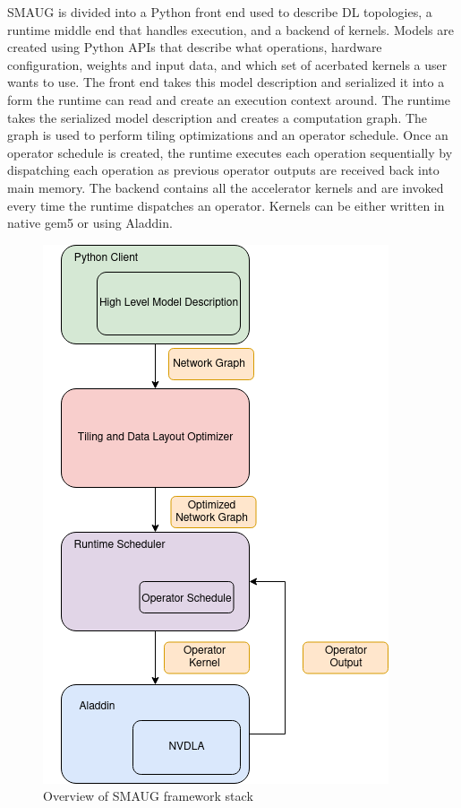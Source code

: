 SMAUG is divided into a Python front end used to describe DL topologies, a
runtime middle end that handles execution, and a backend of kernels. Models are
created using Python APIs that describe what operations, hardware
configuration, weights and input data, and which set of acerbated kernels a
user wants to use. The front end takes this model description and serialized it
into a form the runtime can read and create an execution context around. The
runtime takes the serialized model description and creates a computation graph.
The graph is used to perform tiling optimizations and an operator schedule.
Once an operator schedule is created, the runtime executes each operation
sequentially by dispatching each operation as previous operator outputs are
received back into main memory. The backend contains all the accelerator
kernels and are invoked every time the runtime dispatches an operator. Kernels
can be either written in native gem5 or using Aladdin.





\begin{figure}[th]
\centering
\includegraphics[scale=0.7]{Figures/smaug_stack.png}
\decoRule
\caption[Saved]{Overview of SMAUG framework stack}
\label{fig:Saved}
\end{figure}


